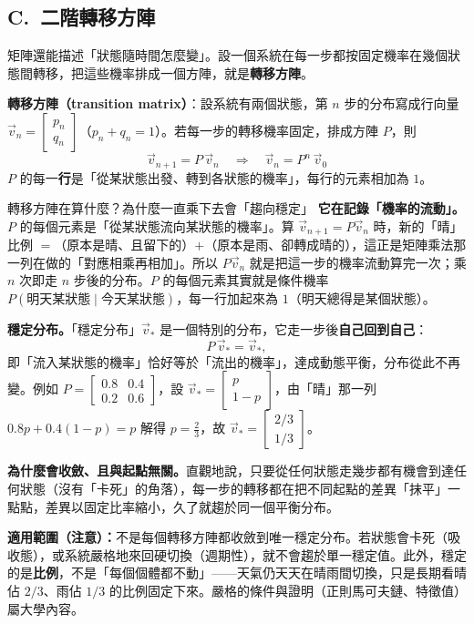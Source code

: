 \documentclass[11pt]{article}
\begin{document}
\subsection*{\sffamily C.\ 二階轉移方陣}

矩陣還能描述「狀態隨時間怎麼變」。設一個系統在每一步都按固定機率在幾個狀態間轉移，把這些機率排成一個方陣，就是\textbf{轉移方陣}。

\textbf{轉移方陣（transition matrix）}：設系統有兩個狀態，第 $n$ 步的分布寫成行向量 $\vec v_n=\begin{bmatrix} p_n\\ q_n \end{bmatrix}$（$p_n+q_n=1$）。若每一步的轉移機率固定，排成方陣 $P$，則
$$\boxed{\;\vec v_{n+1}=P\,\vec v_n\quad\Rightarrow\quad \vec v_n=P^n\,\vec v_0\;}$$
$P$ 的每一\textbf{行}是「從某狀態出發、轉到各狀態的機率」，每行的元素相加為 $1$。


\begin{延伸框}{轉移方陣在算什麼？為什麼一直乘下去會「趨向穩定」}
\textbf{它在記錄「機率的流動」。}$P$ 的每個元素是「從某狀態流向某狀態的機率」。算 $\vec v_{n+1}=P\vec v_n$ 時，新的「晴」比例 $=$（原本是晴、且留下的）$+$（原本是雨、卻轉成晴的），這正是矩陣乘法那一列在做的「對應相乘再相加」。所以 $P\vec v_n$ 就是把這一步的機率流動算完一次；乘 $n$ 次即走 $n$ 步後的分布。$P$ 的每個元素其實就是條件機率 $P(\text{明天某狀態}\mid\text{今天某狀態})$，每一行加起來為 $1$（明天總得是某個狀態）。

\textbf{穩定分布。}「穩定分布」$\vec v_*$ 是一個特別的分布，它走一步後\textbf{自己回到自己}：
$$P\,\vec v_*=\vec v_*,$$
即「流入某狀態的機率」恰好等於「流出的機率」，達成動態平衡，分布從此不再變。例如 $P=\begin{bmatrix} 0.8 & 0.4\\ 0.2 & 0.6 \end{bmatrix}$，設 $\vec v_*=\begin{bmatrix} p\\ 1-p \end{bmatrix}$，由「晴」那一列 $0.8p+0.4(1-p)=p$ 解得 $p=\tfrac23$，故 $\vec v_*=\begin{bmatrix} 2/3\\ 1/3 \end{bmatrix}$。

\textbf{為什麼會收斂、且與起點無關。}直觀地說，只要從任何狀態走幾步都有機會到達任何狀態（沒有「卡死」的角落），每一步的轉移都在把不同起點的差異「抹平」一點點，差異以固定比率縮小，久了就趨於同一個平衡分布。

\textbf{適用範圍（注意）：}不是每個轉移方陣都收斂到唯一穩定分布。若狀態會卡死（吸收態），或系統嚴格地來回硬切換（週期性），就不會趨於單一穩定值。此外，穩定的是\textbf{比例}，不是「每個個體都不動」——天氣仍天天在晴雨間切換，只是長期看晴佔 $2/3$、雨佔 $1/3$ 的比例固定下來。嚴格的條件與證明（正則馬可夫鏈、特徵值）屬大學內容。
\end{延伸框}
\end{document}
